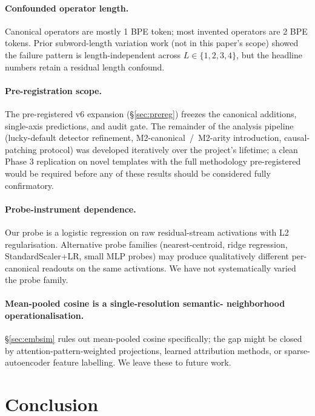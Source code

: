 \documentclass[11pt,letterpaper]{article}
\newcommand{\Mc}{M2-canonical}
\newcommand{\Ma}{M2-arity}
\begin{document}
\paragraph{Confounded operator length.} Canonical operators are
mostly 1 BPE token; most invented operators are 2 BPE tokens. Prior
subword-length variation work (not in this paper's scope) showed the
failure pattern is length-independent across $L \in \{1, 2, 3, 4\}$,
but the headline numbers retain a residual length confound.

\paragraph{Pre-registration scope.} The pre-registered v6 expansion
(\S\ref{sec:prereg}) freezes the canonical additions, single-axis
predictions, and audit gate. The remainder of the analysis pipeline
(lucky-default detector refinement, \Mc{}~/~\Ma{} introduction,
causal-patching protocol) was developed iteratively over the
project's lifetime; a clean Phase 3 replication on novel templates
with the full methodology pre-registered would be required before
any of these results should be considered fully confirmatory.

\paragraph{Probe-instrument dependence.} Our probe is a logistic
regression on raw residual-stream activations with L2
regularisation. Alternative probe families (nearest-centroid, ridge
regression, StandardScaler+LR, small MLP probes) may produce
qualitatively different per-canonical readouts on the same
activations. We have not systematically varied the probe family.

\paragraph{Mean-pooled cosine is a single-resolution semantic-
neighborhood operationalisation.} \S\ref{sec:embsim} rules out
mean-pooled cosine specifically; the gap might be closed by
attention-pattern-weighted projections, learned attribution methods,
or sparse-autoencoder feature labelling. We leave these to future
work.

\section{Conclusion}
\label{sec:conclusion}
\end{document}
